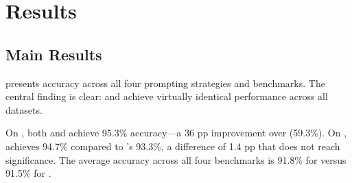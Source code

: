 \section{Results}
\label{sec:results}

\subsection{Main Results}
\label{sec:main_results}

 presents accuracy across all four prompting strategies and benchmarks. The central finding is clear: \storycot and \fewshotcot achieve virtually identical performance across all datasets.

\begin{table}[t]
\centering
\caption{Accuracy (\%) across four prompting strategies and benchmarks. Values in brackets are bootstrap 95\% confidence intervals. Bold indicates the best result per dataset. \storycot and \fewshotcot show no statistically significant differences on any benchmark.}
\label{tab:main}
\vspace{4pt}
\end{table}

On \gsm, both \fewshotcot and \storycot achieve 95.3\% accuracy---a 36 pp improvement over \directprompt (59.3\%). On \arc, \storycot achieves 94.7\% compared to \fewshotcot's 93.3\%, a difference of 1.4 pp that does not reach significance. The average accuracy across all four benchmarks is 91.8\% for \storycot versus 91.5\% for \fewshotcot.


